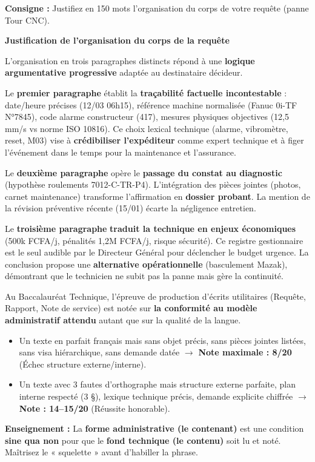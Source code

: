 \documentclass[11pt]{article}
\begin{document}
\begin{exoresolu}
\textbf{Consigne :} Justifiez en 150 mots l'organisation du corps de votre requête (panne Tour CNC).

\tcblower
\textbf{Justification de l'organisation du corps de la requête}

L'organisation en trois paragraphes distincts répond à une \textbf{logique argumentative progressive} adaptée au destinataire décideur.

Le \textbf{premier paragraphe} établit la \textbf{traçabilité factuelle incontestable} : date/heure précises (12/03 06h15), référence machine normalisée (Fanuc 0i-TF N°7845), code alarme constructeur (417), mesures physiques objectives (12,5 mm/s vs norme ISO 10816). Ce choix lexical technique (alarme, vibromètre, reset, M03) vise à \textbf{crédibiliser l'expéditeur} comme expert technique et à figer l'événement dans le temps pour la maintenance et l'assurance.

Le \textbf{deuxième paragraphe} opère le \textbf{passage du constat au diagnostic} (hypothèse roulements 7012-C-TR-P4). L'intégration des pièces jointes (photos, carnet maintenance) transforme l'affirmation en \textbf{dossier probant}. La mention de la révision préventive récente (15/01) écarte la négligence entretien.

Le \textbf{troisième paragraphe} \textbf{traduit la technique en enjeux économiques} (500k FCFA/j, pénalités 1,2M FCFA/j, risque sécurité). Ce registre gestionnaire est le seul audible par le Directeur Général pour déclencher le budget urgence. La conclusion propose une \textbf{alternative opérationnelle} (basculement Mazak), démontrant que le technicien ne subit pas la panne mais gère la continuité.
\end{exoresolu}

\begin{savaistu}[Le Bac Technique : Conformité au modèle = Langue]
Au Baccalauréat Technique, l'épreuve de production d'écrits utilitaires (Requête, Rapport, Note de service) est notée sur \textbf{la conformité au modèle administratif attendu} autant que sur la qualité de la langue.
\begin{itemize}
    \item Un texte en parfait français mais sans objet précis, sans pièces jointes listées, sans visa hiérarchique, sans demande datée $\rightarrow$ \textbf{Note maximale : 8/20} (Échec structure externe/interne).
    \item Un texte avec 3 fautes d'orthographe mais structure externe parfaite, plan interne respecté (3 §), lexique technique précis, demande explicite chiffrée $\rightarrow$ \textbf{Note : 14--15/20} (Réussite honorable).
\end{itemize}
\textbf{Enseignement :} La \textbf{forme administrative (le contenant)} est une condition \textbf{sine qua non} pour que le \textbf{fond technique (le contenu)} soit lu et noté. Maîtrisez le « squelette » avant d'habiller la phrase.
\end{savaistu}
\end{document}
